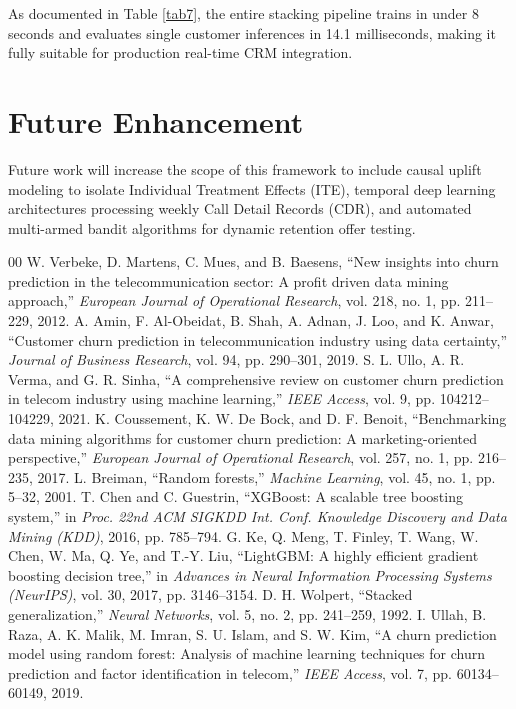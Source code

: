 \documentclass[conference]{IEEEtran}
\begin{document}
As documented in Table \ref{tab7}, the entire stacking pipeline trains in under 8 seconds and evaluates single customer inferences in 14.1 milliseconds, making it fully suitable for production real-time CRM integration.

\section{Future Enhancement}
Future work will increase the scope of this framework to include causal uplift modeling to isolate Individual Treatment Effects (ITE), temporal deep learning architectures processing weekly Call Detail Records (CDR), and automated multi-armed bandit algorithms for dynamic retention offer testing.

\begin{thebibliography}{00}
 W. Verbeke, D. Martens, C. Mues, and B. Baesens, ``New insights into churn prediction in the telecommunication sector: A profit driven data mining approach,'' \textit{European Journal of Operational Research}, vol. 218, no. 1, pp. 211--229, 2012.
 A. Amin, F. Al-Obeidat, B. Shah, A. Adnan, J. Loo, and K. Anwar, ``Customer churn prediction in telecommunication industry using data certainty,'' \textit{Journal of Business Research}, vol. 94, pp. 290--301, 2019.
 S. L. Ullo, A. R. Verma, and G. R. Sinha, ``A comprehensive review on customer churn prediction in telecom industry using machine learning,'' \textit{IEEE Access}, vol. 9, pp. 104212--104229, 2021.
 K. Coussement, K. W. De Bock, and D. F. Benoit, ``Benchmarking data mining algorithms for customer churn prediction: A marketing-oriented perspective,'' \textit{European Journal of Operational Research}, vol. 257, no. 1, pp. 216--235, 2017.
 L. Breiman, ``Random forests,'' \textit{Machine Learning}, vol. 45, no. 1, pp. 5--32, 2001.
 T. Chen and C. Guestrin, ``XGBoost: A scalable tree boosting system,'' in \textit{Proc. 22nd ACM SIGKDD Int. Conf. Knowledge Discovery and Data Mining (KDD)}, 2016, pp. 785--794.
 G. Ke, Q. Meng, T. Finley, T. Wang, W. Chen, W. Ma, Q. Ye, and T.-Y. Liu, ``LightGBM: A highly efficient gradient boosting decision tree,'' in \textit{Advances in Neural Information Processing Systems (NeurIPS)}, vol. 30, 2017, pp. 3146--3154.
 D. H. Wolpert, ``Stacked generalization,'' \textit{Neural Networks}, vol. 5, no. 2, pp. 241--259, 1992.
 I. Ullah, B. Raza, A. K. Malik, M. Imran, S. U. Islam, and S. W. Kim, ``A churn prediction model using random forest: Analysis of machine learning techniques for churn prediction and factor identification in telecom,'' \textit{IEEE Access}, vol. 7, pp. 60134--60149, 2019.

\end{thebibliography}
\end{document}
